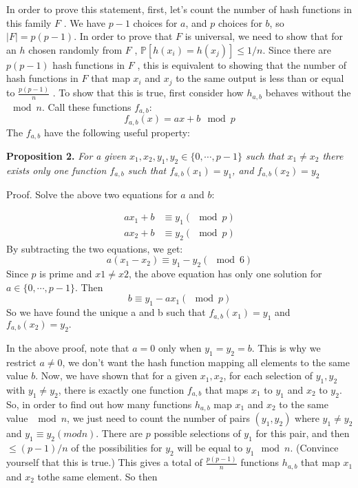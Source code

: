 \documentclass [12pt]{article}
\begin{document}
In order to prove this statement, first, let’s count the number of hash functions in this family $F$ . We have $p-1$ choices for $a$, and $p$ choices for $b$, so $|F| = p(p-1)$. In order to prove that $F$ is universal, we need to show that for an $h$ chosen randomly from $F$ , $\mathbb{P}[h(x_i ) = h(x_j )] \leq 1/n$. Since there are $p(p - 1)$ hash functions in $F$ , this is equivalent to showing that the number of hash functions in $F$ that map $x_i$ and $x_j$ to the same output is less than or equal to $\frac{p(p-1)}{n}$ . To show that this is true, first consider how $h_{a,b}$ behaves without the $\mod n$. Call these functions $f_{a,b}$:
$$
f_{a,b}(x) = ax + b \mod p 
$$
The $f_{a,b}$ have the following useful property: 

\textbf{Proposition 2.} \textit{For a given $x_1, x_2, y_1, y_2 \in \{0, \cdots , p - 1\}$ such that $x_1 \neq x_2$ there exists only one function $f_{a,b}$ such that $f_{a,b}(x_1) = y_1$, and $f_{a,b}(x_2) = y_2$}

 Proof. Solve the above two equations for $a$ and $b$:

 \begin{align*}
  ax_1 + b &\equiv y_1 (\mod p) \\
  ax_2 + b &\equiv y_2 (\mod p)
\end{align*}
By subtracting the two equations, we get:
$$
a(x_1 - x_2) \equiv y_1 - y_2 (\mod 6)
$$
Since $p$ is prime and $x1 \neq x2$, the above equation has only one solution for $a \in \{0, \cdots , p -1\}$.
Then
$$
b \equiv y_1 - ax_1 (\mod p)
$$
So we have found the unique a and b such that $f_{a,b}(x_1) = y_1$ and $f_{a,b}(x_2) = y_2.$

In the above proof, note that $a = 0$ only when $y_1 = y_2 = b$. This is why we restrict $a \neq 0$, we don’t want the hash function mapping all elements to the same value $b$. Now, we have shown that for a given $x_1, x_2$, for each selection of $y_1, y_2$ with $y_1 \neq y_2$, there is exactly one function $f_{a,b}$ that maps $x_1$ to $y_1$ and $x_2$ to $y_2$. So, in order to find out how many functions $h_{a,b}$ map $x_1$ and $x_2$ to the same value $\mod n$, we just need to count the number of pairs $(y_1, y_2)$ where $y_1 \neq y_2$ and $y_1 \equiv y_2 (mod n)$. There are $p$ possible selections of $y_1$ for this pair, and then $\leq (p - 1)/n$ of the possibilities for $y_2$ will be equal to $y_1 \mod n$. (Convince yourself that this is true.) This gives a total of $\frac{p(p-1)}{n}$ functions $h_{a,b}$ that map $x_1$ and $x_2$ tothe same element. So then
\end{document}
